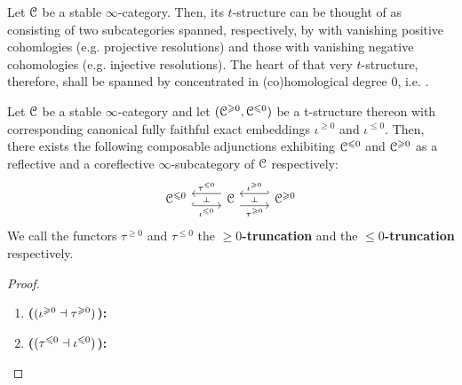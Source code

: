             \begin{remark}
                Let $\mathcal{C}$ be a stable $\infty$-category. Then, its $t$-structure can be thought of as consisting of two subcategories spanned, respectively, by  with vanishing positive cohomlogies (e.g. projective resolutions) and those with vanishing negative cohomologies (e.g. injective resolutions). The heart of that very $t$-structure, therefore, shall be spanned by  concentrated in (co)homological degree $0$, i.e. . 
            \end{remark}
            
            \begin{proposition} \label{prop: t_structures_and_localisations}
                Let $\mathcal{C}$ be a stable $\infty$-category and let $(\mathcal{C}^{\geqslant 0}, \mathcal{C}^{\leqslant 0})$ be a t-structure thereon with corresponding canonical fully faithful exact embeddings $\iota^{\geq 0}$ and $\iota^{\leq 0}$. Then, there exists the following composable adjunctions exhibiting $\mathcal{C}^{\leqslant 0}$ and $\mathcal{C}^{\geqslant 0}$ as a reflective and a coreflective $\infty$-subcategory of $\mathcal{C}$ respectively:
                    $$
                        \begin{tikzcd}
                        	{\C^{\leq 0}} & \C & {\C^{\geq 0}}
                        	\arrow[""{name=0, anchor=center, inner sep=0}, "{\iota^{\leq 0}}"', shift right=2, hook, from=1-1, to=1-2]
                        	\arrow[""{name=1, anchor=center, inner sep=0}, "{\tau^{\leq 0}}"', shift right=2, from=1-2, to=1-1]
                        	\arrow[""{name=2, anchor=center, inner sep=0}, "{\tau^{\geq 0}}"', shift right=2, from=1-2, to=1-3]
                        	\arrow[""{name=3, anchor=center, inner sep=0}, "{\iota^{\geq 0}}"', shift right=2, hook', from=1-3, to=1-2]
                        	\arrow["\dashv"{anchor=center, rotate=-90}, draw=none, from=1, to=0]
                        	\arrow["\dashv"{anchor=center, rotate=-90}, draw=none, from=3, to=2]
                        \end{tikzcd}
                    $$
                We call the functors $\tau^{\geq 0}$ and $\tau^{\leq 0}$ the \textbf{$\geq 0$-truncation} and the \textbf{$\leq 0$-truncation} respectively.
            \end{proposition}
                \begin{proof}
                    \noindent
                    \begin{enumerate}
                        \item \textbf{($(\iota^{\geqslant 0} \dashv \tau^{\geqslant 0})$):}    
                        \item \textbf{($(\tau^{\leqslant 0} \dashv \iota^{\leqslant 0})$):} 
                    \end{enumerate}
                \end{proof}

